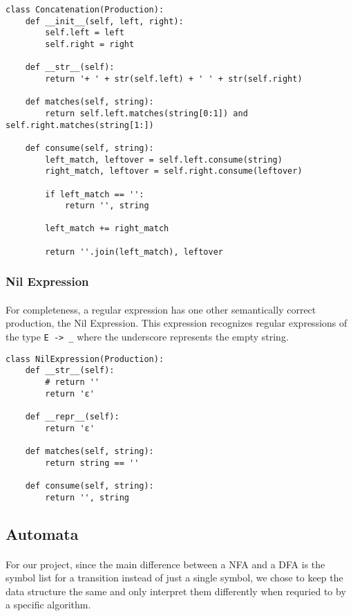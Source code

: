 \documentclass{article}
\begin{document}
\begin{verbatim}
class Concatenation(Production):
    def __init__(self, left, right):
        self.left = left
        self.right = right
    
    def __str__(self):
        return '+ ' + str(self.left) + ' ' + str(self.right)

    def matches(self, string):
        return self.left.matches(string[0:1]) and self.right.matches(string[1:])
    
    def consume(self, string):
        left_match, leftover = self.left.consume(string)
        right_match, leftover = self.right.consume(leftover)

        if left_match == '':
            return '', string
 
        left_match += right_match

        return ''.join(left_match), leftover
\end{verbatim}

\subsubsection{Nil Expression}
\paragraph{} For completeness, a regular expression has one other semantically
correct production, the Nil Expression. This expression recognizes regular 
expressions of the type \verb|E -> _| where the underscore represents the 
empty string. 

\begin{verbatim}
class NilExpression(Production):
    def __str__(self):
        # return ''
        return 'ε'

    def __repr__(self):
        return 'ε'

    def matches(self, string):
        return string == ''

    def consume(self, string):
        return '', string
\end{verbatim}

\subsection{Automata}
\paragraph{} For our project, since the main difference between
a NFA and a DFA is the symbol list for a transition instead of just
a single symbol, we chose to keep the data structure the same and
only interpret them differently when requried to by a specific 
algorithm. 
\end{document}
